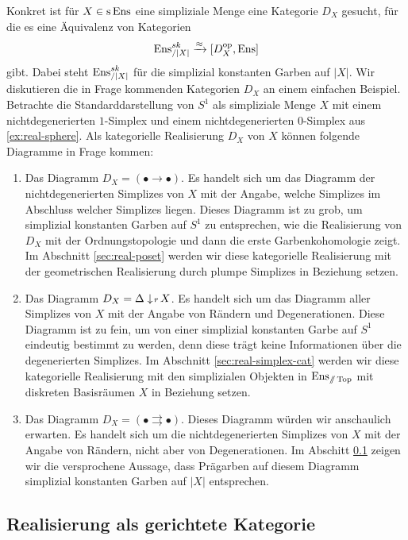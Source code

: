 Konkret ist für $X \in \operatorname{s}\operatorname{Ens}$ eine simpliziale Menge eine Kategorie
$D_X$ gesucht, für die es eine Äquivalenz von Kategorien
\[ \operatorname{Ens}_{/|X|}^{sk} \xrightarrow{\approx} {[D_X^\mathrm{op}, \operatorname{Ens}]} \]
gibt. Dabei steht $\operatorname{Ens}_{/|X|}^{sk}$ für die simplizial konstanten
Garben auf $|X|$. Wir diskutieren die in Frage kommenden Kategorien
$D_X$ an einem einfachen Beispiel. Betrachte die Standarddarstellung
von $S^1$ als simpliziale Menge $X$ mit einem nichtdegenerierten
$1$-Simplex und einem nichtdegenerierten $0$-Simplex aus
\ref{ex:real-sphere}. Als kategorielle Realisierung $D_X$ von $X$
können folgende Diagramme in Frage kommen:
\begin{enumerate}
\item Das Diagramm $D_X = (\bullet \to \bullet)$. Es handelt sich um
  das Diagramm der nichtdegenerierten Simplizes von $X$ mit der
  Angabe, welche Simplizes im Abschluss welcher Simplizes
  liegen. Dieses Diagramm ist zu grob, um simplizial konstanten Garben
  auf $S^1$ zu entsprechen, wie die Realisierung von $D_X$ mit der
  Ordnungstopologie und dann die erste Garbenkohomologie zeigt. Im
  Abschnitt \ref{sec:real-poset} werden wir diese kategorielle
  Realisierung mit der geometrischen Realisierung durch plumpe
  Simplizes in Beziehung setzen.
\item Das Diagramm $D_X = \Delta \downarrow \! {\scriptstyle r} \, X$. Es handelt sich um
  das Diagramm aller Simplizes von $X$ mit der Angabe von Rändern und
  Degenerationen. Diese Diagramm ist zu fein, um von einer simplizial
  konstanten Garbe auf $S^1$ eindeutig bestimmt zu werden, denn diese
  trägt keine Informationen über die degenerierten Simplizes. Im
  Abschnitt \ref{sec:real-simplex-cat} werden wir diese kategorielle
  Realisierung mit den simplizialen Objekten in $\operatorname{Ens}_{\mathbin{/\mkern-6mu/} \operatorname{Top}}$ mit
  diskreten Basisräumen $X$ in Beziehung setzen.
\item Das Diagramm $D_X = (\bullet \rightrightarrows \bullet)$. Dieses
  Diagramm würden wir anschaulich erwarten. Es handelt sich um die
  nichtdegenerierten Simplizes von $X$ mit der Angabe von Rändern,
  nicht aber von Degenerationen. Im Abschitt
  \ref{sec:real-directed-cat} zeigen wir die versprochene Aussage,
  dass Prägarben auf diesem Diagramm simplizial konstanten Garben auf
  $|X|$ entsprechen.
\end{enumerate}

\subsection{Realisierung als gerichtete Kategorie}
\label{sec:real-directed-cat}

